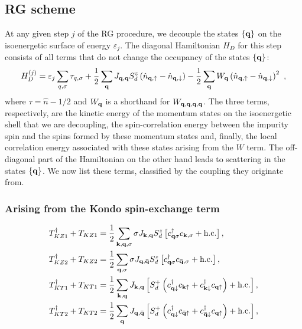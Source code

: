 \subsection{RG scheme}
At any given step \(j\) of the RG procedure, we decouple the states \(\left\{ {\bf q} \right\} \) on the isoenergetic surface of energy \(\varepsilon_j\). The diagonal Hamiltonian \(H_D\) for this step consists of all terms that do not change the occupancy of the states \(\left\{{\bf q}\right\}\):
\begin{equation}\begin{aligned}
	H_D^{(j)} = \varepsilon_j\sum_{q,\sigma}\tau_{q,\sigma} + \frac{1}{2}\sum_{{\bf q}}J_{{\bf q}, {\bf q}}S_d^z\left(\hat n_{{\bf q}, \uparrow} - \hat n_{{\bf q}, \downarrow}\right) - \frac{1}{2}\sum_{{\bf q}}W_{\bf q}\left(\hat n_{{\bf q}, \uparrow} - \hat n_{{\bf q}, \downarrow}\right)^2~,
\end{aligned}\end{equation}
where \(\tau = \hat n - 1/2\) and \(W_{{\bf q}}\) is a shorthand for \(W_{{\bf q},{\bf q},{\bf q},{\bf q}}\). The three terms, respectively, are the kinetic energy of the momentum states on the isoenergetic shell that we are decoupling, the spin-correlation energy between the impurity spin and the spins formed by these momentum states and, finally, the local correlation energy associated with these states arising from the \(W\) term. The off-diagonal part of the Hamiltonian on the other hand leads to scattering in the states \(\left\{ {\bf q} \right\} \). We now list these terms, classified by the coupling they originate from.

\subsubsection*{Arising from the Kondo spin-exchange term}
\begin{equation}\begin{aligned}
	T_{KZ1}^\dagger + T_{KZ1} &= \frac{1}{2}\sum_{{\bf k}, {\bf q}, \sigma}\sigma J_{{\bf k}, {\bf q}} S_d^z  \left[c^\dagger_{{\bf q}\sigma}c_{{\bf k},\sigma} + \text{h.c.}\right],\\
	T_{KZ2}^\dagger + T_{KZ2} &= \frac{1}{2}\sum_{{\bf q}, \sigma}\sigma J_{{\bf q}, {\bf \bar q}} S_d^z  \left[c^\dagger_{{\bf q}\sigma}c_{{\bf \bar q},\sigma} + \text{h.c.}\right],\\
	T_{KT1}^\dagger + T_{KT1} &= \frac{1}{2}\sum_{{\bf k}, {\bf q}}J_{{\bf k}, {\bf q}} \left[S_d^+\left(c^\dagger_{{\bf q}\downarrow}c_{{\bf k}\uparrow} + c^\dagger_{{\bf k}\downarrow}c_{{\bf q}\uparrow}\right) + \text{h.c.}\right],\\
	T_{KT2}^\dagger + T_{KT2} &= \frac{1}{2}\sum_{{\bf q}}J_{{\bf q}, {\bf \bar q}} \left[S_d^+\left(c^\dagger_{{\bf q}\downarrow}c_{{\bf \bar q}\uparrow} + c^\dagger_{{\bf \bar q}\downarrow}c_{{\bf q}\uparrow}\right) + \text{h.c.}\right],\\
\end{aligned}\end{equation}
